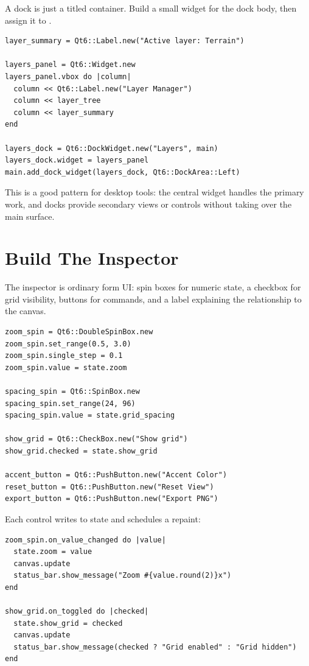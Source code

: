 A dock is just a titled container. Build a small widget for the dock body, then assign it to .

\begin{lstlisting}[style=crystal]
layer_summary = Qt6::Label.new("Active layer: Terrain")

layers_panel = Qt6::Widget.new
layers_panel.vbox do |column|
  column << Qt6::Label.new("Layer Manager")
  column << layer_tree
  column << layer_summary
end

layers_dock = Qt6::DockWidget.new("Layers", main)
layers_dock.widget = layers_panel
main.add_dock_widget(layers_dock, Qt6::DockArea::Left)
\end{lstlisting}

This is a good pattern for desktop tools: the central widget handles the primary work, and docks provide secondary views or controls without taking over the main surface.

\section{Build The Inspector}

The inspector is ordinary form UI: spin boxes for numeric state, a checkbox for grid visibility, buttons for commands, and a label explaining the relationship to the canvas.

\begin{lstlisting}[style=crystal]
zoom_spin = Qt6::DoubleSpinBox.new
zoom_spin.set_range(0.5, 3.0)
zoom_spin.single_step = 0.1
zoom_spin.value = state.zoom

spacing_spin = Qt6::SpinBox.new
spacing_spin.set_range(24, 96)
spacing_spin.value = state.grid_spacing

show_grid = Qt6::CheckBox.new("Show grid")
show_grid.checked = state.show_grid

accent_button = Qt6::PushButton.new("Accent Color")
reset_button = Qt6::PushButton.new("Reset View")
export_button = Qt6::PushButton.new("Export PNG")
\end{lstlisting}

Each control writes to state and schedules a repaint:

\begin{lstlisting}[style=crystal]
zoom_spin.on_value_changed do |value|
  state.zoom = value
  canvas.update
  status_bar.show_message("Zoom #{value.round(2)}x")
end

show_grid.on_toggled do |checked|
  state.show_grid = checked
  canvas.update
  status_bar.show_message(checked ? "Grid enabled" : "Grid hidden")
end
\end{lstlisting}

